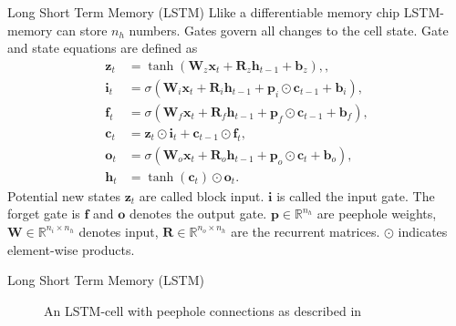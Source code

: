 \documentclass{beamer}
\begin{document}
    \begin{frame}{Long Short Term Memory (LSTM)}
      Llike a differentiable memory chip \cite{graves2012supervised} LSTM-memory can store $n_h$ numbers. Gates govern all changes to the cell state.
      Gate and state equations are defined as~\cite{hochreiter1997long,greff2016lstm}
      \begin{align}
          \mathbf{z}_t &= \tanh( \mathbf{W}_z \mathbf{x}_t + \mathbf{R}_z \mathbf{h}_{t-1}
                                + \mathbf{b}_z), \label{eq:state_candidate}, \\
          \mathbf{i}_t &=  \sigma( \mathbf{W}_i \mathbf{x}_t + \mathbf{R}_i \mathbf{h}_{t-1}
                               + \mathbf{p}_i \odot \mathbf{c}_{t-1}+ \mathbf{b}_i), \label{eq:input} \\
          \mathbf{f}_t &= \sigma(\mathbf{W}_f \mathbf{x}_t + \mathbf{R}_f \mathbf{h}_{t-1}
                                + \mathbf{p}_f \odot \mathbf{c}_{t-1}+ \mathbf{b}_f), \label{eq:forget} \\
          \mathbf{c}_t &= \mathbf{z}_t \odot \mathbf{i}_t + \mathbf{c}_{t-1} \odot \mathbf{f}_t, \\
          \mathbf{o}_t &= \sigma(\mathbf{W}_o \mathbf{x}_t + \mathbf{R}_o \mathbf{h}_{t-1}
                                + \mathbf{p}_o \odot \mathbf{c}_t+ \mathbf{b}_o), \label{eq:output} \\
          \mathbf{h}_t &= \tanh(\mathbf{c}_t) \odot \mathbf{o}_t.
      \end{align}
      Potential new states $\mathbf{z}_t$ are called block input. 
      $\mathbf{i}$ is called the input gate. The forget gate is $\mathbf{f}$ and
      $\mathbf{o}$ denotes the output gate.
      $\mathbf{p} \in \mathbb{R}^{n_h}$ are peephole weights,
      $\mathbf{W} \in \mathbb{R}^{n_i \times n_h}$ denotes input,
      $\mathbf{R} \in \mathbb{R}^{n_o \times n_h}$ are the recurrent matrices.
      $\odot$ indicates element-wise products. 
    \end{frame}


    \begin{frame}{Long Short Term Memory (LSTM)}
      \begin{figure}
        
        \caption{An LSTM-cell with peephole connections as described in \cite{hochreiter1997long,greff2016lstm}}
      \end{figure}
    \end{frame}
\end{document}
